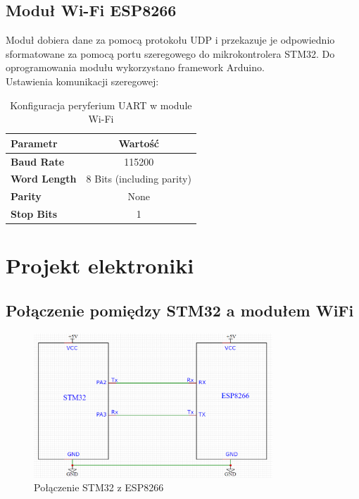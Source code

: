 \documentclass[10pt, a4paper]{article}
\begin{document}
\subsection{Moduł Wi-Fi ESP8266}
Moduł dobiera dane za pomocą protokołu UDP i przekazuje je odpowiednio sformatowane za pomocą portu szeregowego do mikrokontrolera STM32. Do oprogramowania modułu wykorzystano framework Arduino. \\
Ustawienia komunikacji szeregowej:
	\begin{table}[H]
		\centering
		\begin{tabular}{|l|c|} \hline
			\textbf{Parametr} & Wartość \\
			\hline
			\hline  \textbf{Baud Rate}&115200  \\\hline
			\textbf{Word Length } & 8 Bits (including parity)\\\hline
			\textbf{Parity} &  None\\
			\hline
			\textbf{Stop Bits}& 1\\
			\hline
		\end{tabular}
		\caption{Konfiguracja peryferium UART w module Wi-Fi}
		\label{tab:UARTWiFI}
	\end{table}

\section{Projekt elektroniki}
	\subsection{Połączenie pomiędzy STM32 a modułem WiFi}
		\begin{figure}[H]
			\centering
			\includegraphics[width=0.8\textwidth]{figures/uart.png}
			\caption{Połączenie STM32 z ESP8266}
			\label{fig:UART}
		\end{figure}
	
\end{document}
